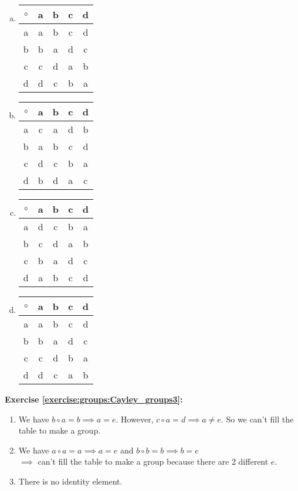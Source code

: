 \begin{enumerate}[(a)]
\item

\begin{center}
	\begin{tabular}{c| c c c c }
		$\circ$ & a & b & c & d\\
		\hline
		a & a & b & c & d\\
		b & b & a & d & c\\
		c & c & d & a & b\\
		d & d & c & b & a
	\end{tabular}
\end{center}
\item

\begin{center}
	\begin{tabular}{c| c c c c }
		$\circ$ & a & b & c & d\\
		\hline
		a & c & a & d & b\\
		b & a & b & c & d\\
		c & d & c & b & a\\
		d & b & d & a & c
	\end{tabular}
\end{center}
\item

\begin{center}
	\begin{tabular}{c| c c c c }
		$\circ$ & a & b & c & d\\
		\hline
		a & d & c & b & a\\
		b & c & d & a & b\\
		c & b & a & d & c\\
		d & a & b & c & d
	\end{tabular}
\end{center}
\item
 
\begin{center}
	\begin{tabular}{c| c c c c }
		$\circ$ & a & b & c & d\\
		\hline
		a & a & b & c & d\\
		b & b & a & d & c\\
		c & c & d & b & a\\
		d & d & c & a & b
	\end{tabular}
\end{center}
\end{enumerate}
\textbf{Exercise \ref{exercise:groups:Cayley_groups3}:}
\begin{enumerate}
\item
We have $b\circ a=b\implies a=e$. However, $c\circ a=d\implies a\neq e$.
So we can't fill the table to make a group.
\item
 We have $a\circ a=a\implies a=e$ and $b\circ b=b\implies b=e$\\
$\implies$  can't fill the table to make a group because there are 2 different $e$.
\item
There is no identity element.
\end{enumerate}
